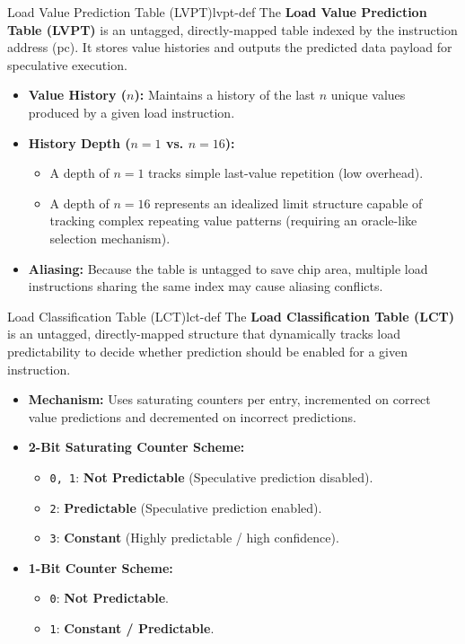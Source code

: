 \begin{definition}{Load Value Prediction Table (LVPT)}{lvpt-def}
The \textbf{Load Value Prediction Table (LVPT)} is an untagged, directly-mapped table indexed by the instruction address (\gls{pc}). It stores value histories and outputs the predicted data payload for speculative execution.
\begin{itemize}
    \item \textbf{Value History ($n$):} Maintains a history of the last $n$ unique values produced by a given load instruction.
    \item \textbf{History Depth ($n=1$ vs. $n=16$):} 
    \begin{itemize}
        \item A depth of $n=1$ tracks simple last-value repetition (low overhead).
        \item A depth of $n=16$ represents an idealized limit structure capable of tracking complex repeating value patterns (requiring an oracle-like selection mechanism).
    \end{itemize}
    \item \textbf{Aliasing:} Because the table is untagged to save chip area, multiple load instructions sharing the same index may cause aliasing conflicts.
\end{itemize}
\end{definition}

\begin{definition}{Load Classification Table (LCT)}{lct-def}
The \textbf{Load Classification Table (LCT)} is an untagged, directly-mapped structure that dynamically tracks load predictability to decide whether prediction should be enabled for a given instruction.
\begin{itemize}
    \item \textbf{Mechanism:} Uses saturating counters per entry, incremented on correct value predictions and decremented on incorrect predictions.
    \item \textbf{2-Bit Saturating Counter Scheme:}
    \begin{itemize}
        \item \texttt{0, 1}: \textbf{Not Predictable} (Speculative prediction disabled).
        \item \texttt{2}: \textbf{Predictable} (Speculative prediction enabled).
        \item \texttt{3}: \textbf{Constant} (Highly predictable / high confidence).
    \end{itemize}
    \item \textbf{1-Bit Counter Scheme:}
    \begin{itemize}
        \item \texttt{0}: \textbf{Not Predictable}.
        \item \texttt{1}: \textbf{Constant / Predictable}.
    \end{itemize}
\end{itemize}
\end{definition}

